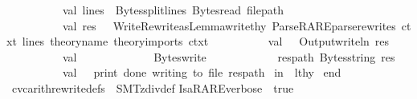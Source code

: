 \begin{isabellebody}
\ \ \ \ \ \ \ \ \ \ val\ lines\ {\isacharequal}{\kern0pt}\ Bytes{\isachardot}{\kern0pt}split{\isacharunderscore}{\kern0pt}lines\ {\isacharparenleft}{\kern0pt}Bytes{\isachardot}{\kern0pt}read\ file{\isacharunderscore}{\kern0pt}path{\isacharparenright}{\kern0pt}\isanewline
\ \ \ \ \ \ \ \ \ \ val\ res\ {\isacharequal}{\kern0pt}\ \ {\isacharparenleft}{\kern0pt}Write{\isacharunderscore}{\kern0pt}Rewrite{\isacharunderscore}{\kern0pt}as{\isacharunderscore}{\kern0pt}Lemma{\isachardot}{\kern0pt}write{\isacharunderscore}{\kern0pt}thy\ {\isacharparenleft}{\kern0pt}Parse{\isacharunderscore}{\kern0pt}RARE{\isachardot}{\kern0pt}parse{\isacharunderscore}{\kern0pt}rewrites\ ctxt\ lines{\isacharparenright}{\kern0pt}\ theory{\isacharunderscore}{\kern0pt}name\ theory{\isacharunderscore}{\kern0pt}imports\ ctxt{\isacharparenright}{\kern0pt}\isanewline
\ \ \ \ \ \ \ \ \ \ val\ {\isacharunderscore}{\kern0pt}\ {\isacharequal}{\kern0pt}\ {\isacharparenleft}{\kern0pt}Output{\isachardot}{\kern0pt}writeln\ res{\isacharparenright}{\kern0pt}\isanewline
\isanewline
\ \ \ \ \ \ \ \ \ \ val\ {\isacharunderscore}{\kern0pt}\ {\isacharequal}{\kern0pt}\isanewline
\ \ \ \ \ \ \ \ \ \ \ Bytes{\isachardot}{\kern0pt}write\isanewline
\ \ \ \ \ \ \ \ \ \ \ \ res{\isacharunderscore}{\kern0pt}path\ {\isacharparenleft}{\kern0pt}Bytes{\isachardot}{\kern0pt}string\ res{\isacharparenright}{\kern0pt}\isanewline
\ \ \ \ \ \ \ \ \ \ val\ {\isacharunderscore}{\kern0pt}\ {\isacharequal}{\kern0pt}\ {\isacharat}{\kern0pt}{\isacharbraceleft}{\kern0pt}print{\isacharbraceright}{\kern0pt}\ {\isacharparenleft}{\kern0pt}{\isachardoublequote}{\kern0pt}done\ writing\ to\ file{\isachardoublequote}{\kern0pt}{\isacharcomma}{\kern0pt}\ res{\isacharunderscore}{\kern0pt}path{\isacharparenright}{\kern0pt}\isanewline
\ in\ \ lthy\isanewline
\ end{\isacharparenright}{\kern0pt}{\isacharparenright}{\kern0pt}\isanewline
{\isacartoucheclose}%
\endisatagML
{\isafoldML}%
%
\isadelimML
%
\endisadelimML
\isanewline
\isanewline
{}\isamarkupfalse%
\ cvc{\isacharunderscore}{\kern0pt}arith{\isacharunderscore}{\kern0pt}rewrite{\isacharunderscore}{\kern0pt}defs\ {\isacharequal}{\kern0pt}\ SMT{\isachardot}{\kern0pt}z{}div{\isacharunderscore}{\kern0pt}def%
\isadelimdocument
%
\endisadelimdocument
%
\isatagdocument
%
\isamarkuptrue%
%
\endisatagdocument
{\isafolddocument}%
%
\isadelimdocument
%
\endisadelimdocument
{}\isamarkupfalse%
{\isacharbrackleft}{\kern0pt}{\isacharbrackleft}{\kern0pt}IsaRARE{\isacharunderscore}{\kern0pt}verbose\ {\isacharequal}{\kern0pt}\ true{\isacharbrackright}{\kern0pt}{\isacharbrackright}{\kern0pt}\ \isanewline

\end{isabellebody}
